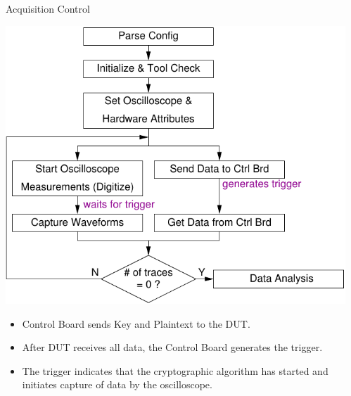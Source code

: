 \documentclass[xcolor=pdftex,dvipsnames,table,final]{beamer}
\begin{document}
\begin{frame}[fragile]{}
\begin{columns}[t]
\begin{column}{.31\linewidth}
      \begin{block}{Acquisition Control}
        \begin{center}
          \includegraphics[scale=1.5]{../figures/data_acq}
        \end{center} 
        \begin{itemize}
          \item Control Board sends Key and Plaintext to the DUT.
          \item After DUT receives all data, the Control Board generates the trigger.
          \item The trigger indicates that the cryptographic algorithm has started
                and initiates capture of data by the oscilloscope.
        \end{itemize}
       \end{block}
     
          
    \end{column}
   \begin{column}{.31\linewidth}
    

\end{column}
\end{columns}
\end{frame}
\end{document}
